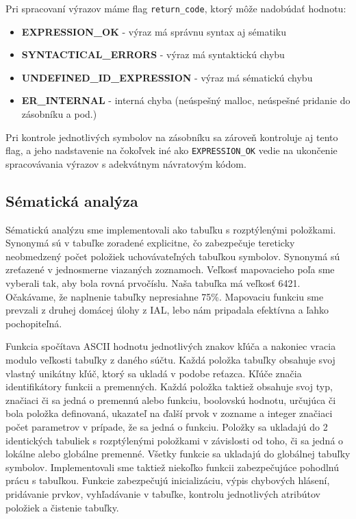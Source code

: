 \documentclass [11pt, a4paper]{article}
\begin{document}
Pri spracovaní výrazov máme flag \texttt{return\_code}, ktorý môže nadobúdať hodnotu:
\begin{itemize}
\item \textbf{EXPRESSION\_OK} - výraz má správnu syntax aj sématiku
\item \textbf{SYNTACTICAL\_ERRORS} - výraz má syntaktickú chybu
\item \textbf{UNDEFINED\_ID\_EXPRESSION} - výraz má sématickú chybu
\item \textbf{ER\_INTERNAL} - interná chyba (neúspešný malloc, neúspešné pridanie do zásobníku a pod.)
\end{itemize}

Pri kontrole jednotlivých symbolov na zásobníku sa zároveň kontroluje aj tento flag, a jeho nadstavenie na čokoľvek iné ako \texttt{EXPRESSION\_OK} vedie na ukončenie spracovávania výrazov s adekvátnym návratovým kódom.

\subsection{Sématická analýza}
Sématickú analýzu sme implementovali ako tabuľku s rozptýlenými položkami. Synonymá sú v tabuľke zoradené explicitne, čo zabezpečuje tereticky neobmedzený počet položiek uchovávateľných tabuľkou symbolov. Synonymá sú zreťazené v jednosmerne viazaných zoznamoch. Veľkosť mapovacieho poľa sme vyberali tak, aby bola rovná prvočíslu. Naša tabuľka má veľkosť 6421. Očakávame, že naplnenie tabuľky nepresiahne 75\%. Mapovaciu funkciu sme prevzali z druhej domácej úlohy z IAL, lebo nám pripadala efektívna a ľahko pochopiteľná. 

Funkcia spočítava ASCII hodnotu jednotlivých znakov kľúča a nakoniec vracia modulo veľkosti tabuľky z daného súčtu. Každá položka tabuľky obsahuje svoj vlastný unikátny kľúč, ktorý sa ukladá v podobe reťazca. Kľúče značia identifikátory funkcii a premenných. Každá položka taktiež obsahuje svoj typ, značiaci či sa jedná o premennú alebo funkciu, boolovskú hodnotu, určujúca či bola položka definovaná, ukazateľ na ďalší prvok v zozname a integer značiaci počet parametrov v prípade, že sa jedná o funkciu. Položky sa ukladajú do 2 identických tabuliek s rozptýlenými položkami v závislosti od toho, či sa jedná o lokálne alebo globálne premenné. Všetky funkcie sa ukladajú do globálnej tabuľky symbolov. Implementovali sme taktiež niekoľko funkcii zabezpečujúce pohodlnú prácu s tabuľkou. Funkcie zabezpečujú inicializáciu, výpis chybových hlásení, pridávanie prvkov, vyhľadávanie v tabuľke, kontrolu jednotlivých atribútov položiek a čistenie tabuľky.
\end{document}
